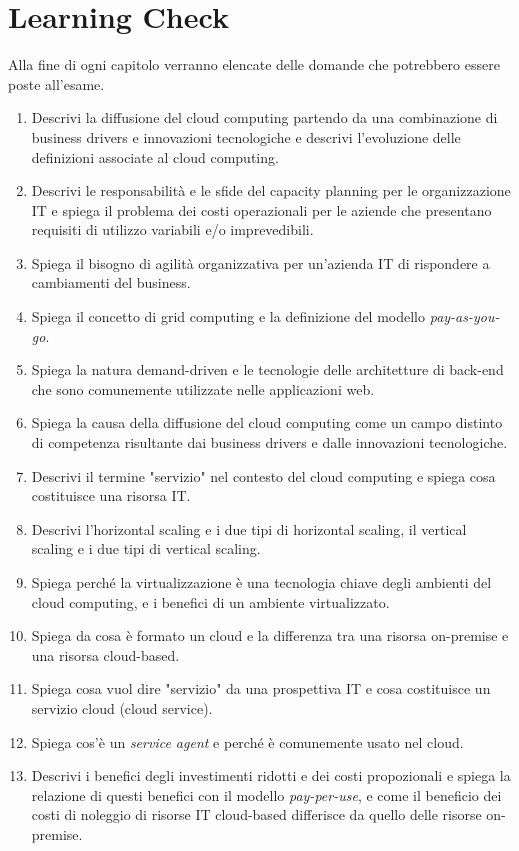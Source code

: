 \section{Learning Check}
Alla fine di ogni capitolo verranno elencate delle domande che potrebbero essere poste all'esame.
\begin{enumerate}
    \item Descrivi la diffusione del cloud computing partendo da una combinazione di business drivers e innovazioni tecnologiche e descrivi l'evoluzione delle definizioni associate al cloud computing.
    \item Descrivi le responsabilità e le sfide del capacity planning per le organizzazione IT e spiega il problema dei costi operazionali per le aziende che presentano requisiti di utilizzo variabili e/o imprevedibili.
    \item Spiega il bisogno di agilità organizzativa per un'azienda IT di rispondere a cambiamenti del business.
    \item Spiega il concetto di grid computing e la definizione del modello \textit{pay-as-you-go}.
    \item Spiega la natura demand-driven e le tecnologie delle architetture di back-end che sono comunemente utilizzate nelle applicazioni web.
    \item Spiega la causa della diffusione del cloud computing come un campo distinto di competenza risultante dai business drivers e dalle innovazioni tecnologiche.
    \item Descrivi il termine "servizio" nel contesto del cloud computing e spiega cosa costituisce una risorsa IT.
    \item Descrivi l'horizontal scaling e i due tipi di horizontal scaling, il vertical scaling e i due tipi di vertical scaling.
    \item Spiega perché la virtualizzazione è una tecnologia chiave degli ambienti del cloud computing, e i benefici di un ambiente virtualizzato.
    \item Spiega da cosa è formato un cloud e la differenza tra una risorsa on-premise e una risorsa cloud-based.
    \item Spiega cosa vuol dire "servizio" da una prospettiva IT e cosa costituisce un servizio cloud (cloud service).
    \item Spiega cos'è un \textit{service agent} e perché è comunemente usato nel cloud.
    \item Descrivi i benefici degli investimenti ridotti e dei costi propozionali e spiega la relazione di questi benefici con il modello \textit{pay-per-use}, e come il beneficio dei costi di noleggio di risorse IT cloud-based differisce da quello delle risorse on-premise.

\end{enumerate}
